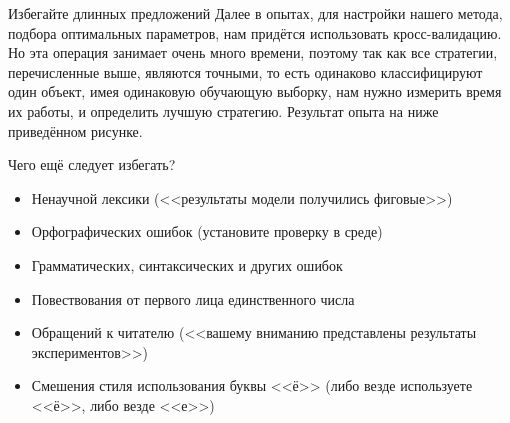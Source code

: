 \documentclass[fleqn, xcolor=x11names]{beamer}
\begin{document}
\begin{frame}{Избегайте длинных предложений}
    Далее в опытах, для настройки нашего метода, подбора оптимальных параметров, нам придётся использовать кросс-валидацию. Но эта операция занимает очень много времени, поэтому так как все стратегии, перечисленные выше, являются точными, то есть одинаково классифицируют один объект, имея одинаковую обучающую выборку, нам нужно измерить время их работы, и определить лучшую стратегию. Результат опыта на ниже приведённом рисунке.
\end{frame}

\begin{frame}{Чего ещё следует избегать?}
\begin{itemize}
    \item Ненаучной лексики (<<результаты модели получились фиговые>>)
    \item Орфографических ошибок (установите проверку в среде)
    \item Грамматических, синтаксических и других ошибок
    \item Повествования от первого лица единственного числа
    \item Обращений к читателю (<<вашему вниманию представлены результаты экспериментов>>)
    \item Смешения стиля использования буквы <<ё>> (либо везде используете <<ё>>, либо везде <<е>>)
\end{itemize}
\end{frame}
\end{document}
